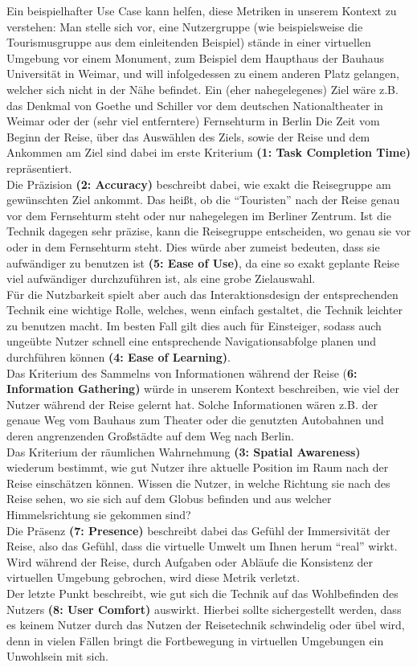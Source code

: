 Ein beispielhafter Use Case kann helfen, diese Metriken in unserem Kontext zu verstehen:
Man stelle sich vor, eine Nutzergruppe (wie beispielsweise die Tourismusgruppe aus dem einleitenden Beispiel) stände in einer virtuellen Umgebung vor einem Monument, zum Beispiel dem Haupthaus der Bauhaus Universität in Weimar, und will infolgedessen zu einem anderen Platz gelangen, welcher sich nicht in der Nähe befindet. Ein (eher nahegelegenes) Ziel wäre z.B. das Denkmal von Goethe und Schiller vor dem deutschen Nationaltheater in Weimar oder der (sehr viel entferntere) Fernsehturm in Berlin
Die Zeit vom Beginn der Reise, über das Auswählen des Ziels, sowie der Reise und dem Ankommen am Ziel sind dabei im erste Kriterium \textbf{(1: Task Completion Time)} repräsentiert.\\
Die Präzision \textbf{(2: Accuracy)} beschreibt dabei, wie exakt die Reisegruppe am gewünschten Ziel ankommt. Das heißt, ob die “Touristen” nach der Reise genau vor dem Fernsehturm steht oder nur nahegelegen im Berliner Zentrum. Ist die Technik dagegen sehr präzise, kann die Reisegruppe entscheiden, wo genau sie vor oder in dem Fernsehturm steht. Dies würde aber zumeist bedeuten, dass sie aufwändiger zu benutzen ist \textbf{(5: Ease of Use)}, da eine so exakt geplante Reise viel aufwändiger durchzuführen ist, als eine grobe Zielauswahl.\\
Für die Nutzbarkeit spielt aber auch das Interaktionsdesign der entsprechenden Technik eine wichtige Rolle, welches, wenn einfach gestaltet, die Technik leichter zu benutzen macht. Im besten Fall gilt dies auch für Einsteiger, sodass auch ungeübte Nutzer schnell eine entsprechende Navigationsabfolge planen und durchführen können \textbf{(4: Ease of Learning)}.\\
Das Kriterium des Sammelns von Informationen während der Reise (\textbf{6: Information Gathering)} würde in unserem Kontext beschreiben, wie viel der Nutzer während der Reise gelernt hat. Solche Informationen wären z.B. der genaue Weg vom Bauhaus zum Theater oder die genutzten Autobahnen und deren angrenzenden Großstädte auf dem Weg nach Berlin.\\
Das Kriterium der räumlichen Wahrnehmung \textbf{(3: Spatial Awareness)} wiederum bestimmt, wie gut Nutzer ihre aktuelle Position im Raum nach der Reise einschätzen können. Wissen die Nutzer, in welche Richtung sie nach des Reise sehen, wo sie sich auf dem Globus befinden und aus welcher Himmelsrichtung sie gekommen sind?\\
Die Präsenz \textbf{(7: Presence)} beschreibt dabei das Gefühl der Immersivität der Reise, also das Gefühl, dass die virtuelle Umwelt um Ihnen herum “real” wirkt. Wird während der Reise, durch Aufgaben oder Abläufe die Konsistenz der virtuellen Umgebung gebrochen, wird diese Metrik verletzt.\\
Der letzte Punkt beschreibt, wie gut sich die Technik auf das Wohlbefinden des Nutzers \textbf{(8: User Comfort)} auswirkt. Hierbei sollte sichergestellt werden, dass es keinem Nutzer durch das Nutzen der Reisetechnik schwindelig oder übel wird, denn in vielen Fällen bringt die Fortbewegung in virtuellen Umgebungen ein Unwohlsein mit sich.

